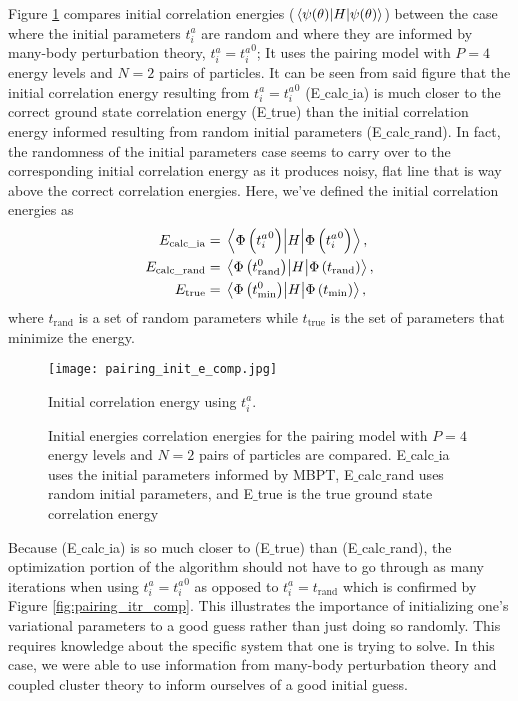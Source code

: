 \documentclass[Dual]{msu-thesis}
\begin{document}
Figure \ref{fig:pairing_init_e_comp} compares initial correlation energies ($\mel{\psi(\theta)}{H}{\psi(\theta)}$) between the case where the initial parameters $t^a_i$ are random and where they are informed by many-body perturbation theory, $t_i^a={t_i^a}^{0}$; It uses the pairing model with $P=4$ energy levels and $N=2$ pairs of particles. It can be seen from said figure that the initial correlation energy resulting from $t_i^a={t_i^a}^{0}$ (E$\_$calc$\_$ia) is much closer to the correct ground state correlation energy (E$\_$true) than the initial correlation energy informed resulting from random initial parameters (E$\_$calc$\_$rand). In fact, the randomness of the initial parameters case seems to carry over to the corresponding initial correlation energy as it produces noisy, flat line that is way above the correct correlation energies. Here, we've defined the initial correlation energies as
\begin{align}
\label{initial_energies}
E_{\text{calc\_ia}} &= \mel{\Phi\left({t_i^a}^{0}\right)}{H}{\Phi\left({t_i^a}^{0}\right)},
\\
E_{\text{calc\_rand}} &= \mel{\Phi\left(t_{\text{rand}}^{0}\right)}{H}{\Phi\left(t_{\text{rand}}\right)},
\\
E_{\text{true}} &= \mel{\Phi\left(t_{\text{min}}^{0}\right)}{H}{\Phi\left(t_{\text{min}}\right)},
\end{align}
where $t_{\text{rand}}$ is a set of random parameters while $t_{\text{true}}$ is the set of parameters that minimize the energy.

\begin{figure}[H]
    \centering
    \texttt{[image: pairing\_init\_e\_comp.jpg]}
    \caption
    {Initial correlation energy using $t_i^a$.}
    \label{fig:pairing_init_e_comp}
    \caption{Initial energies correlation energies for the pairing model with $P=4$ energy levels and $N=2$ pairs of particles are compared. E$\_$calc$\_$ia uses the initial parameters informed by MBPT, E$\_$calc$\_$rand uses random initial parameters, and E$\_$true is the true ground state correlation energy}
\end{figure}

Because (E$\_$calc$\_$ia) is so much closer to (E$\_$true) than (E$\_$calc$\_$rand), the optimization portion of the algorithm should not have to go through as many iterations when using $t_i^a={t_i^a}^{0}$ as opposed to $t_i^a=t_{\text{rand}}$  which is confirmed by Figure \ref{fig:pairing_itr_comp}. This illustrates the importance of initializing one's variational parameters to a good guess rather than just doing so randomly. This requires knowledge about the specific system that one is trying to solve. In this case, we were able to use information from many-body perturbation theory and coupled cluster theory to inform ourselves of a good initial guess.
\end{document}
